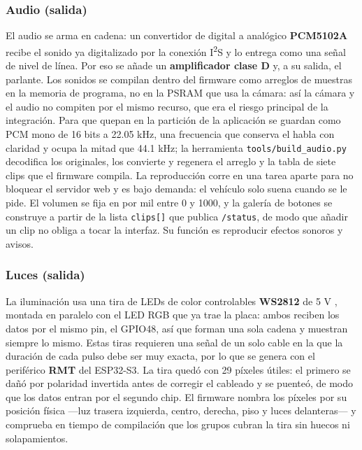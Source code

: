\documentclass[journal]{IEEEtran}
\begin{document}
\subsubsection{Audio (salida)}
El audio se arma en cadena: un convertidor de digital a analógico \textbf{PCM5102A} \cite{pcm5102a} recibe el sonido ya digitalizado por la conexión I\textsuperscript{2}S y lo entrega como una señal de nivel de línea. Por eso se añade un \textbf{amplificador clase D} \cite{pam8302a} y, a su salida, el parlante. Los sonidos se compilan dentro del firmware como arreglos de muestras en la memoria de programa, no en la PSRAM que usa la cámara: así la cámara y el audio no compiten por el mismo recurso, que era el riesgo principal de la integración. Para que quepan en la partición de la aplicación se guardan como PCM mono de 16 bits a 22.05 kHz, una frecuencia que conserva el habla con claridad y ocupa la mitad que 44.1 kHz; la herramienta \texttt{tools/build\_audio.py} decodifica los originales, los convierte y regenera el arreglo y la tabla de siete clips que el firmware compila. La reproducción corre en una tarea aparte para no bloquear el servidor web y es bajo demanda: el vehículo solo suena cuando se le pide. El volumen se fija en por mil entre 0 y 1000, y la galería de botones se construye a partir de la lista \texttt{clips[]} que publica \texttt{/status}, de modo que añadir un clip no obliga a tocar la interfaz. Su función es reproducir efectos sonoros y avisos.

\subsubsection{Luces (salida)}
La iluminación usa una tira de LEDs de color controlables \textbf{WS2812} de 5 V \cite{ws2812}, montada en paralelo con el LED RGB que ya trae la placa: ambos reciben los datos por el mismo pin, el GPIO48, así que forman una sola cadena y muestran siempre lo mismo. Estas tiras requieren una señal de un solo cable en la que la duración de cada pulso debe ser muy exacta, por lo que se genera con el periférico \textbf{RMT} del ESP32-S3. La tira quedó con 29 píxeles útiles: el primero se dañó por polaridad invertida antes de corregir el cableado y se puenteó, de modo que los datos entran por el segundo chip. El firmware nombra los píxeles por su posición física ---luz trasera izquierda, centro, derecha, piso y luces delanteras--- y comprueba en tiempo de compilación que los grupos cubran la tira sin huecos ni solapamientos.
\end{document}
